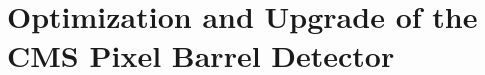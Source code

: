 \documentclass[a4paper, 11pt, twoside, openany]{ThesisStyle}
\begin{document}
	

	

	

\part{Optimization and Upgrade of the CMS Pixel Barrel Detector}

	

	
					
\end{document}
